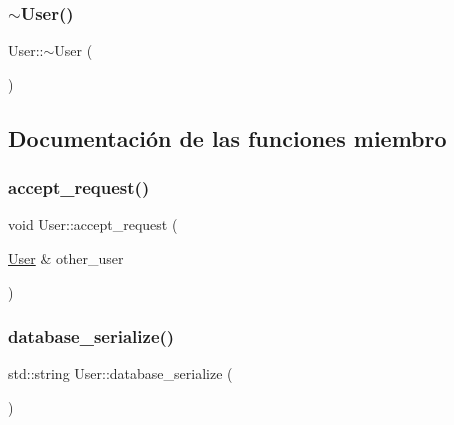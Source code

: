 \mbox{\label{classUser_ac00b72ad64eb4149f7b21b9f5468c2b2}} 
\subsubsection{\texorpdfstring{$\sim$\+User()}{~User()}}
{\footnotesize\ttfamily User\+::$\sim$\+User (\begin{DoxyParamCaption}{ }\end{DoxyParamCaption})}



\subsection{Documentación de las funciones miembro}
\mbox{\label{classUser_aecb82a4b3775064eb10fcdaf288fbfa4}} 
\subsubsection{\texorpdfstring{accept\+\_\+request()}{accept\_request()}}
{\footnotesize\ttfamily void User\+::accept\+\_\+request (\begin{DoxyParamCaption}\item[{\hyperlink{classUser}{User} \&}]{other\+\_\+user }\end{DoxyParamCaption})}

\mbox{\label{classUser_a027b5483be61adf2d2b18c06e0f76409}} 
\subsubsection{\texorpdfstring{database\+\_\+serialize()}{database\_serialize()}}
{\footnotesize\ttfamily std\+::string User\+::database\+\_\+serialize (\begin{DoxyParamCaption}{ }\end{DoxyParamCaption})}

\mbox{\label{classUser_a4d4864c9959ed4db8c1e92ab924f0d76}} 
